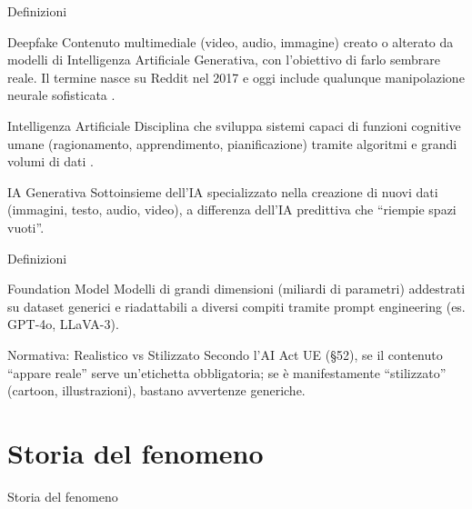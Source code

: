 \documentclass[12pt]{beamer}
\begin{document}
\begin{frame}{Definizioni}
\small
  \begin{alertblock}{Deepfake}
    Contenuto multimediale (video, audio, immagine) creato o alterato da modelli di Intelligenza Artificiale Generativa, con l’obiettivo di farlo sembrare reale. Il termine nasce su Reddit nel 2017 e oggi include qualunque manipolazione neurale sofisticata \cite{nsa_definition}.
  \end{alertblock}
  \begin{alertblock}{Intelligenza Artificiale}
    Disciplina che sviluppa sistemi capaci di funzioni cognitive umane (ragionamento, apprendimento, pianificazione) tramite algoritmi e grandi volumi di dati \cite{nist_definition_ai}.
  \end{alertblock}
  \begin{alertblock}{IA Generativa}
    Sottoinsieme dell’IA specializzato nella creazione di nuovi dati (immagini, testo, audio, video), a differenza dell’IA predittiva che “riempie spazi vuoti”.
  \end{alertblock}
\end{frame}

\begin{frame}{Definizioni}
  \begin{alertblock}{Foundation Model}
    Modelli di grandi dimensioni (miliardi di parametri) addestrati su dataset generici e riadattabili a diversi compiti tramite prompt engineering (es. GPT-4o, LLaVA-3).
  \end{alertblock}
  \begin{alertblock}{Normativa: Realistico vs Stilizzato}
    Secondo l’AI Act UE (\S52), se il contenuto “appare reale” serve un’etichetta obbligatoria; se è manifestamente “stilizzato” (cartoon, illustrazioni), bastano avvertenze generiche.
  \end{alertblock}
\end{frame}

\section{Storia del fenomeno}
\begin{frame}
\Huge
\begin{center}
Storia del fenomeno
\end{center}
\end{frame}
\end{document}
